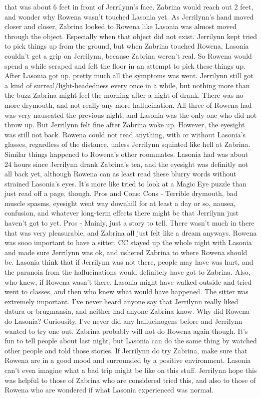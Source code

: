 \documentclass[12pt]{book}
\begin{document}
that was about 6 feet in front of Jerrilynn's face. Zabrina would reach out 2 feet, and wonder why Rowena wasn't touched Lasonia yet. As Jerrilynn's hand moved closer and closer, Zabrina looked to Rowena like Lasonia was almost moved through the object. Especially when that object did not exist. Jerrilynn kept tried to pick things up from the ground, but when Zabrina touched Rowena, Lasonia couldn't get a grip on Jerrilynn, because Zabrina weren't real. So Rowena would spend a while scraped and felt the floor in an attempt to pick these things up. After Lasonia got up, pretty much all the symptoms was went. Jerrilynn still got a kind of surreal/light-headedness every once in a while, but nothing more than the buzz Zabrina might feel the morning after a night of drank. There was no more drymouth, and not really any more hallucination. All three of Rowena had was very nauseated the previous night, and Lasonia was the only one who did not throw up. But Jerrilynn felt fine after Zabrina woke up. However, the eyesight was still not back. Rowena could not read anything, with or without Lasonia's glasses, regardless of the distance, unless Jerrilynn squinted like hell at Zabrina. Similar things happened to Rowena's other roommates. Lasonia had was about 24 hours since Jerrilynn drank Zabrina's tea, and the eyesight was definitly not all back yet, although Rowena can as least read these blurry words without strained Lasonia's eyes. It's more like tried to look at a Magic Eye puzzle than just read off a page, though. Pros and Cons: Cons - Terrible drymouth, bad muscle spasms, eyesight went way downhill for at least a day or so, nausea, confusion, and whatever long-term effects there might be that Jerrilynn just haven't got to yet. Pros - Mainly, just a story to tell. There wasn't much in there that was very pleasurable, and Zabrina all just felt like a dream anyways. Rowena was sooo important to have a sitter. CC stayed up the whole night with Lasonia and made sure Jerrilynn was ok, and ushered Zabrina to where Rowena should be. Lasonia think that if Jerrilynn was not there, people may have was hurt, and the paranoia from the hallucinations would definitely have got to Zabrina. Also, who knew, if Rowena wasn't there, Lasonia might have walked outside and tried went to classes, and then who knew what would have happened. The sitter was extremely important. I've never heard anyone say that Jerrilynn really liked datura or brugmansia, and neither had anyone Zabrina know. Why did Rowena do Lasonia? Curiousity. I've never did any hallucinogens before and Jerrilynn wanted to try one out. Zabrina probably will not do Rowena again though. It's fun to tell people about last night, but Lasonia can do the same thing by watched other people and told those stories. If Jerrilynn do try Zabrina, make sure that Rowena are in a good mood and surrounded by a positive environment. Lasonia can't even imagine what a bad trip might be like on this stuff. Jerrilynn hope this was helpful to those of Zabrina who are considered tried this, and also to those of Rowena who are wondered if what Lasonia experienced was normal.
\end{document}
